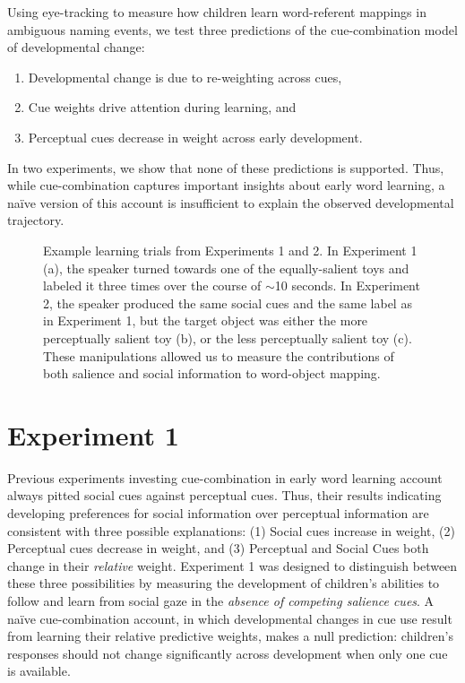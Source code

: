 \documentclass[man,floatsintext]{apa6}
\begin{document}
Using eye-tracking to measure how children learn word-referent mappings in ambiguous naming events, we test three predictions of the cue-combination model of developmental change:

\begin{enumerate}[noitemsep]
	\item Developmental change is due to re-weighting across cues,
	\item Cue weights drive attention during learning, and
	\item Perceptual cues decrease in weight across early development.
\end{enumerate}

\noindent In two experiments, we show that none of these predictions is supported. Thus, while cue-combination captures important insights about early word learning, a na\"{i}ve version of this account is insufficient to explain the observed developmental trajectory.

\begin{figure}[tb]
	\caption{\label{fig:design} Example learning trials from Experiments 1 and 2. In Experiment 1 (a), the speaker turned towards one of the equally-salient toys and labeled it three times over the course of $\sim$10 seconds. In Experiment 2, the speaker produced the same social cues and the same label as in Experiment 1, but the target object was either the more perceptually salient toy (b), or the less perceptually salient toy (c). These manipulations allowed us to measure the contributions of both salience and social information to word-object mapping.}
\end{figure}

\section{Experiment 1}

Previous experiments investing cue-combination in early word learning account always pitted social cues against perceptual cues. Thus, their results indicating developing preferences for social information over perceptual information are consistent with three possible explanations: (1) Social cues increase in weight, (2) Perceptual cues decrease in weight, and (3) Perceptual and Social Cues both change in their \emph{relative} weight. Experiment 1 was designed to distinguish between these three possibilities by measuring the development of children's abilities to follow and learn from social gaze in the \emph{absence of competing salience cues}. A na\"{i}ve cue-combination account, in which developmental changes in cue use result from learning their relative predictive weights, makes a null prediction: children's responses should not change significantly across development when only one cue is available. 
\end{document}
